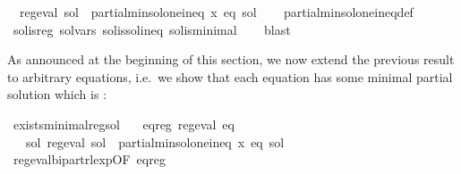 \begin{isabellebody}
\ \ {\isachardoublequoteopen}reg{\isacharunderscore}{\kern0pt}eval\ sol\ {\isasymand}\ partial{\isacharunderscore}{\kern0pt}min{\isacharunderscore}{\kern0pt}sol{\isacharunderscore}{\kern0pt}one{\isacharunderscore}{\kern0pt}ineq\ x\ eq\ sol{\isachardoublequoteclose}\isanewline
%
\isadelimproof
\ \ %
\endisadelimproof
%
\isatagproof
{}\isamarkupfalse%
\ partial{\isacharunderscore}{\kern0pt}min{\isacharunderscore}{\kern0pt}sol{\isacharunderscore}{\kern0pt}one{\isacharunderscore}{\kern0pt}ineq{\isacharunderscore}{\kern0pt}def\isanewline
\ \ \isamarkupfalse%
\ sol{\isacharunderscore}{\kern0pt}is{\isacharunderscore}{\kern0pt}reg\ sol{\isacharunderscore}{\kern0pt}vars\ sol{\isacharunderscore}{\kern0pt}is{\isacharunderscore}{\kern0pt}sol{\isacharunderscore}{\kern0pt}ineq\ sol{\isacharunderscore}{\kern0pt}is{\isacharunderscore}{\kern0pt}minimal\isanewline
\ \ \isamarkupfalse%
\ blast%
\endisatagproof
{\isafoldproof}%
%
\isadelimproof
\isanewline
%
\endisadelimproof
\isanewline
{}\isamarkupfalse%
%
\begin{isamarkuptext}%
As announced at the beginning of this section, we now extend the previous result to arbitrary
equations, i.e.\ we show that each  equation has some minimal partial solution which is
:%
\end{isamarkuptext}\isamarkuptrue%
\isamarkupfalse%
\ exists{\isacharunderscore}{\kern0pt}minimal{\isacharunderscore}{\kern0pt}reg{\isacharunderscore}{\kern0pt}sol{\isacharcolon}{\kern0pt}\isanewline
\ \ \ eq{\isacharunderscore}{\kern0pt}reg{\isacharcolon}{\kern0pt}\ {\isachardoublequoteopen}reg{\isacharunderscore}{\kern0pt}eval\ eq{\isachardoublequoteclose}\isanewline
\ \ \ {\isachardoublequoteopen}{\isasymexists}sol{\isachardot}{\kern0pt}\ reg{\isacharunderscore}{\kern0pt}eval\ sol\ {\isasymand}\ partial{\isacharunderscore}{\kern0pt}min{\isacharunderscore}{\kern0pt}sol{\isacharunderscore}{\kern0pt}one{\isacharunderscore}{\kern0pt}ineq\ x\ eq\ sol{\isachardoublequoteclose}\isanewline
%
\isadelimproof
%
\endisadelimproof
%
\isatagproof
{}\isamarkupfalse%
\ {\isacharminus}{\kern0pt}\isanewline
\ \ \isamarkupfalse%
\ reg{\isacharunderscore}{\kern0pt}eval{\isacharunderscore}{\kern0pt}bipart{\isacharunderscore}{\kern0pt}rlexp{\isacharbrackleft}{\kern0pt}OF\ eq{\isacharunderscore}{\kern0pt}reg{\isacharbrackright}{\kern0pt}\ \isamarkupfalse%

\end{isabellebody}
